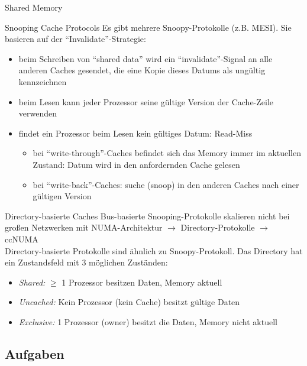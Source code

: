 \begin{defi}{Shared Memory}
    \begin{defi}{Snooping Cache Protocols}
        Es gibt mehrere Snoopy-Protokolle (z.B. MESI).
        Sie basieren auf der \enquote{Invalidate}-Strategie:
        \begin{itemize}
            \item beim Schreiben von \enquote{shared data} wird ein \enquote{invalidate}-Signal an alle anderen Caches gesendet,
            die eine Kopie dieses Datums als ungültig kennzeichnen
            \item beim Lesen kann jeder Prozessor seine gültige Version der Cache-Zeile verwenden
            \item findet ein Prozessor beim Lesen kein gültiges Datum: Read-Miss
            \begin{itemize}
                \item bei \enquote{write-through}-Caches befindet sich das Memory immer im aktuellen Zustand:
                Datum wird in den anfordernden Cache gelesen
                \item bei \enquote{write-back}-Caches:
                suche (snoop) in den anderen Caches nach einer gültigen Version
            \end{itemize}
        \end{itemize}

        \begin{defi}{Directory-basierte Caches}
            Bus-basierte Snooping-Protokolle skalieren nicht bei großen Netzwerken mit NUMA-Architektur
            $\to$ Directory-Protokolle $\to$ ccNUMA \\
            Directory-basierte Protokolle sind ähnlich zu Snoopy-Protokoll.
            Das Directory hat ein Zustandsfeld mit 3 möglichen Zuständen:
            \begin{itemize}
                \item \emph{Shared:}     $\geq$ 1 Prozessor besitzen Daten, Memory aktuell
                \item \emph{Uncached:}   Kein Prozessor (kein Cache) besitzt gültige Daten
                \item \emph{Exclusive:}  1 Prozessor (owner) besitzt die Daten, Memory nicht aktuell
            \end{itemize}
        \end{defi}

        \subsection{Aufgaben}


\end{defi}
\end{defi}
